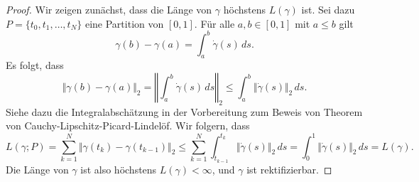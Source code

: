 \documentclass[../main.tex]{subfiles}
\begin{document}
\begin{proof}
  Wir zeigen zunächst, dass die Länge von $\gamma$ 
  höchstens $L(\gamma)$ ist.
  Sei dazu $P = \{t_0, t_1, \dots, t_N\}$ eine Partition
  von $[0,1]$.
  Für alle $a,b \in [0, 1]$ mit $a \leq b$ gilt
  \[
    \gamma(b) - \gamma(a) = \int_{a}^{b} \dot \gamma(s) \, ds.
  \]
  Es folgt, dass
  \[
    \Vert \gamma(b) - \gamma(a) \Vert_2 =
    \left\Vert \int_{a}^{b} \dot \gamma(s) \, ds \right\Vert_2
    \leq \int_{a}^{b} \Vert \dot \gamma(s) \Vert_2 \, ds.
  \]
  Siehe dazu die Integralabschätzung in der Vorbereitung
  zum Beweis von Theorem von Cauchy-Lipschitz-Picard-Lindelöf.
  Wir folgern, dass
  \[
    L(\gamma ; P) = \sum_{k=1}^{N} 
    \Vert \gamma(t_k) - \gamma(t_{k-1}) \Vert_2
    \leq
    \sum_{k=1}^{N} \int_{t_{k-1}}^{t_k} \Vert \dot \gamma(s) \Vert_2 \, ds
    = \int_{0}^{1} \Vert \dot \gamma(s) \Vert_2 \, ds = L(\gamma).
  \]
  Die Länge von $\gamma$ ist also höchstens $L(\gamma) < \infty$,
  und $\gamma$ ist rektifizierbar.


\end{proof}
\end{document}

